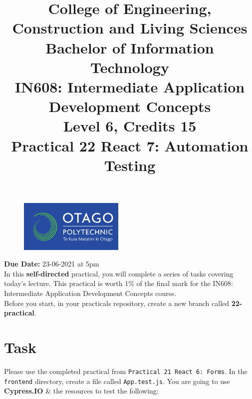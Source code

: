 \documentclass{article}
\author{}
\begin{document}
\begin{figure}
	\centering
	\includegraphics[width=50mm]{img/logo.png}
\end{figure}

\title{College of Engineering, Construction and Living Sciences\\Bachelor of Information Technology\\IN608: Intermediate Application Development Concepts\\Level 6, Credits 15\\\textbf{Practical 22 React 7: Automation Testing}} 
\date{}
\maketitle

\textbf{Due Date:} 23-06-2021 at 5pm \\

In this \textbf{self-directed} practical, you will complete a series of tasks covering today's lecture. This practical is worth 1\% of the final mark for the IN608: Intermediate Application Development Concepts course. \\

Before you start, in your practicals repository, create a new branch called \textbf{22-practical}. 

\section*{Task} 
Please use the completed practical from \texttt{Practical 21 React 6: Forms}. In the \texttt{frontend} directory, create a file called \texttt{App.test.js}. You are going to use \textbf{Cypress.IO} \& the resources to test the following:
\end{document}
